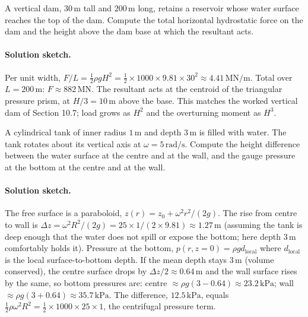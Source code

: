 \begin{exercise}
A vertical dam, $30\,\si{\meter}$ tall and $200\,\si{\meter}$
long, retains a reservoir whose water surface reaches the top of
the dam. Compute the total horizontal hydrostatic force on the
dam and the height above the dam base at which the resultant
acts.

\paragraph{Solution sketch.} Per unit width, $F/L = \tfrac12 \rho g H^2
= \tfrac12 \times 1000 \times 9.81 \times 30^2 \approx 4.41\,\text{MN/m}$.
Total over $L = 200\,\si{\meter}$: $F \approx 882\,\text{MN}$. The
resultant acts at the centroid of the triangular pressure prism, at
$H/3 = 10\,\si{\meter}$ above the base. This matches the worked vertical
dam of Section 10.7; load grows as $H^2$ and the overturning moment as
$H^3$.
\end{exercise}

\begin{exercise}
A cylindrical tank of inner radius $1\,\si{\meter}$ and depth
$3\,\si{\meter}$ is filled with water. The tank rotates about
its vertical axis at $\omega = 5\,\text{rad/s}$. Compute the
height difference between the water surface at the centre and
at the wall, and the gauge pressure at the bottom at the centre
and at the wall.

\paragraph{Solution sketch.} The free surface is a paraboloid,
$z(r) = z_0 + \omega^2 r^2/(2g)$. The rise from centre to wall is
$\Delta z = \omega^2 R^2/(2g) = 25 \times 1/(2 \times 9.81) \approx
1.27\,\si{\meter}$ (assuming the tank is deep enough that the water does
not spill or expose the bottom; here depth $3\,\si{\meter}$ comfortably
holds it). Pressure at the bottom, $p(r,z=0) = \rho g d_{\text{local}}$
where $d_{\text{local}}$ is the local surface-to-bottom depth. If the
mean depth stays $3\,\si{\meter}$ (volume conserved), the centre surface
drops by $\Delta z/2 \approx 0.64\,\si{\meter}$ and the wall surface
rises by the same, so bottom pressures are: centre $\approx \rho g (3 -
0.64) \approx 23.2\,\text{kPa}$; wall $\approx \rho g (3 + 0.64) \approx
35.7\,\text{kPa}$. The difference, $12.5\,\text{kPa}$, equals
$\tfrac12\rho\omega^2 R^2 = \tfrac12 \times 1000 \times 25 \times 1$,
the centrifugal pressure term.
\end{exercise}

